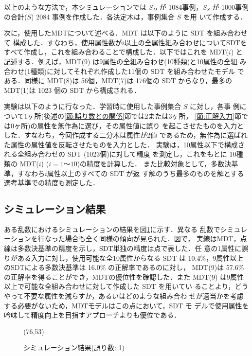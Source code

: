 以上のような方法で，本シミュレーションでは $S_D$ が 1084事例，$S_S$ が 
1000事例の合計($S$) 2084 事例を作成した．各決定木は，事例集合 $S$ を用
いて作成する．

次に，使用したMDTについて述べる．MDT は以下のように SDT を組み合わせて
構成した．すなわち，使用属性数が$i$以上の全属性組み合わせについてSDTを
すべて作成し，これを組み合わることで構成した．以下ではこれを MDT($i$)
と記述する．例えば，MDT(9) は9属性の全組み合わせ(10種類)と10属性の全組
み合わせ(1種類)に対してそれぞれ作成した11個の SDT を組み合わせたモデル
である．同様に MDT(8)は 56個，MDT(7)は 176個の SDT からなり，最多の
MDT(1)は 1023 個の SDT から構成される．

実験は以下のように行なった．学習時に使用した事例集合 $S$ に対し，各事
例について1ヶ所(後述の\ref{節:誤り数との関係}節では2または3ヶ所，
{}\ref{節:正解入力}節では0ヶ所)の属性を無作為に選び，その属性値に誤り
を起こさせたものを入力とした．すなわち，今回作成する二分木は属性が2値
であるため，無作為に選ばれた属性の属性値を反転させたものを入力とした．
実験は，10属性以下で構成される全組み合わせの SDT (1023個)に対して精度
を測定し，これをもとに 10種類の MDT($i$) ($i=1〜10$)の精度を計算した．
また比較対象として，多数決基準，すなわち$i$属性以上のすべての SDT が返
す解のうち最多のものを解とする選考基準での精度も測定した．


\subsection{シミュレーション結果}

ある乱数におけるシミュレーションの結果を図\ref{図:1誤り}に示す．異なる
乱数でシミュレーションを行なった場合も全く同様の傾向が見られた．図で，
実線はMDT，点線は多数決基準の精度を示し，SDT単独の精度は点で表した．任
意の1属性に誤りがある入力に対し，使用可能な全10属性からなる SDT は 
10.4\%，9属性以上のSDTによる多数決基準は 16.0\% の正解率であるのに対し，
MDT(9)は 57.6\% の正解率を得ることができ，MDTの優位性を確認した．また 
MDT(9) は9属性以上で可能な全組み合わせに対して作成した SDT を用いてい
ることより，どうやって不要な属性を減らすか，あるいはどのような組み合わ
せが適当かを考慮する必要がないため，MDTモデルはこの点において，SDT モ
デルで使用属性を吟味して精度向上を目指すアプローチよりも優位である．

\begin{figure}
\begin{center}
    \begin{epsf}
    \end{epsf}
    \begin{draft}
    \atari(76,53)
    \end{draft}
\vspace{1mm}
\caption{シミュレーション結果(誤り数: 1)}
\label{図:1誤り}
\end{center}
\end{figure}

